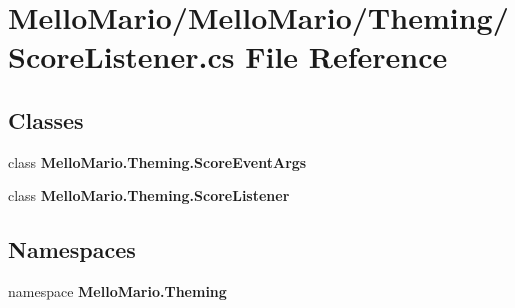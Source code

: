 \section{Mello\+Mario/\+Mello\+Mario/\+Theming/\+Score\+Listener.cs File Reference}
\label{ScoreListener_8cs}
\subsection*{Classes}
\begin{DoxyCompactItemize}
\item 
class \textbf{ Mello\+Mario.\+Theming.\+Score\+Event\+Args}
\item 
class \textbf{ Mello\+Mario.\+Theming.\+Score\+Listener}
\end{DoxyCompactItemize}
\subsection*{Namespaces}
\begin{DoxyCompactItemize}
\item 
namespace \textbf{ Mello\+Mario.\+Theming}
\end{DoxyCompactItemize}

